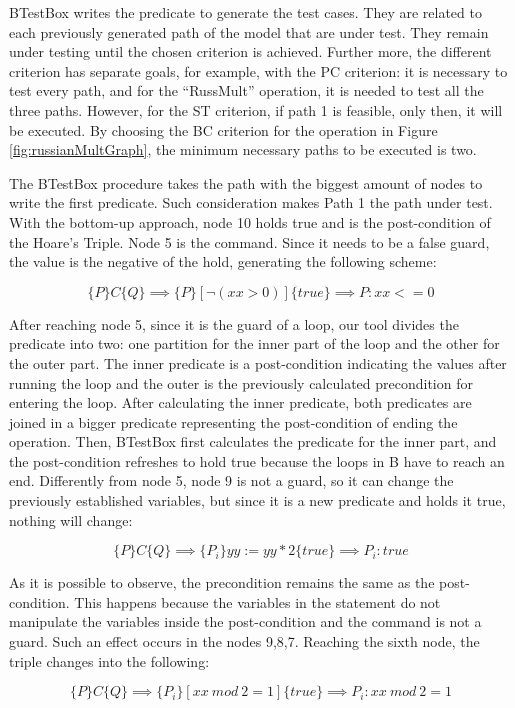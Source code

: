 \documentclass[runningheads]{llncs}
\begin{document}
 BTestBox writes the predicate to generate the test cases. They are related to each previously generated path of the model that are under test. They remain under testing until the chosen criterion is achieved. Further more, the different criterion has separate goals, for example, with the PC criterion: it is necessary to test every path, and for the ``RussMult'' operation, it is needed to test all the three paths. However, for the ST criterion, if path 1 is feasible, only then, it will be executed. By choosing the BC criterion for the operation in Figure \ref{fig:russianMultGraph}, the minimum necessary paths to be executed is two.

The BTestBox procedure takes the path with the biggest amount of nodes to write the first predicate. Such consideration makes Path 1 the path under test. With the bottom-up approach, node 10 holds true and is the post-condition of the Hoare's Triple. Node 5 is the command. Since it needs to be a false guard, the value is the negative of the hold, generating the following scheme:

$$\{P\} C \{Q\} \implies \{P\} [\neg(xx > 0)] \{true\} \implies P: xx <= 0$$

After reaching node 5, since it is the guard of a loop, our tool divides the predicate into two: one partition for the inner part of the loop and the other for the outer part. The inner predicate is a post-condition indicating the values after running the loop and the outer is the previously calculated precondition for entering the loop. After calculating the inner predicate, both predicates are joined in a bigger predicate representing the post-condition of ending the operation. Then, BTestBox first calculates the predicate for the inner part, and the post-condition refreshes to hold true because the loops in B have to reach an end. Differently from node 5, node 9 is not a guard, so it can change the previously established variables, but since it is a new predicate and holds it true, nothing will change:

$$\{P\} C \{Q\} \implies \{P_i\} yy := yy * 2\{true\} \implies P_i: true$$

As it is possible to observe, the precondition remains the same as the post-condition. This happens because the variables in the statement do not manipulate the variables inside the post-condition and the command is not a guard. Such an effect occurs in the nodes 9,8,7. Reaching the sixth node, the triple changes into the following:

$$\{P\} C \{Q\} \implies \{P_i\} [xx\ mod\ 2=1]\{true\} \implies P_i: xx\ mod\ 2 = 1$$
\end{document}
